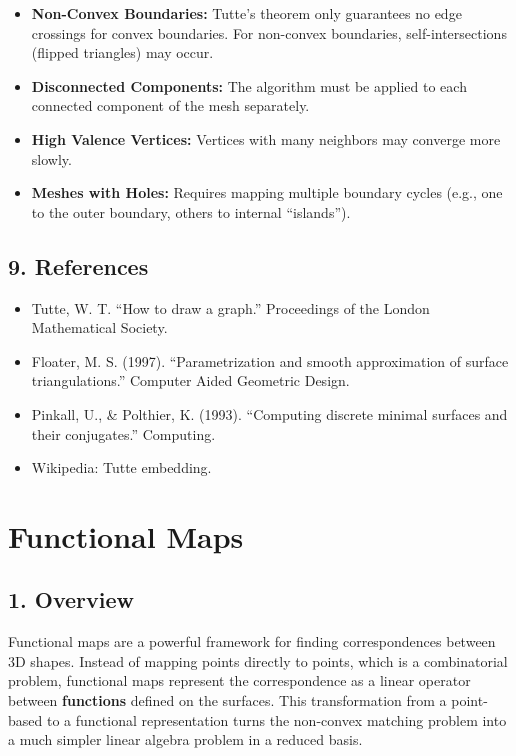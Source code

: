 \begin{itemize}
    \item \textbf{Non-Convex Boundaries:} Tutte's theorem only guarantees no edge crossings for convex boundaries. For non-convex boundaries, self-intersections (flipped triangles) may occur.
    \item \textbf{Disconnected Components:} The algorithm must be applied to each connected component of the mesh separately.
    \item \textbf{High Valence Vertices:} Vertices with many neighbors may converge more slowly.
    \item \textbf{Meshes with Holes:} Requires mapping multiple boundary cycles (e.g., one to the outer boundary, others to internal ``islands'').
\end{itemize}

\subsection{9. References}

\begin{itemize}
    \item Tutte, W. T. \cite{tutte1963} ``How to draw a graph.'' Proceedings of the London Mathematical Society.
    \item Floater, M. S. (1997). ``Parametrization and smooth approximation of surface triangulations.'' Computer Aided Geometric Design.
    \item Pinkall, U., \& Polthier, K. (1993). ``Computing discrete minimal surfaces and their conjugates.'' Computing.
    \item Wikipedia: Tutte embedding.
\end{itemize}

\section{Functional Maps}
\label{sec:functional_maps}

\subsection{1. Overview}

Functional maps are a powerful framework for finding correspondences between 3D shapes\cite{ovsjanikov2012}. Instead of mapping points directly to points, which is a combinatorial problem, functional maps represent the correspondence as a linear operator between \textbf{functions} defined on the surfaces. This transformation from a point-based to a functional representation turns the non-convex matching problem into a much simpler linear algebra problem in a reduced basis.

